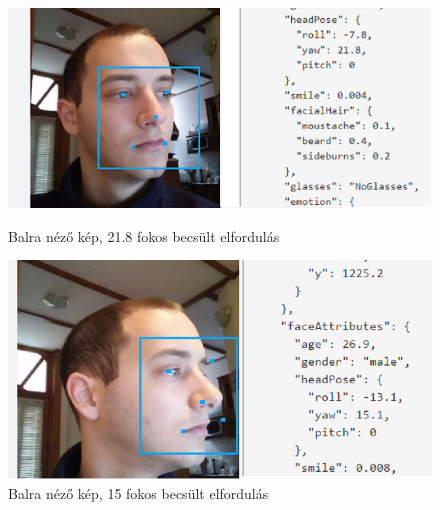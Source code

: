 \begin{figure}[h]
 \begin{minipage}{.5\textwidth} 
\centering
    \includegraphics[scale=0.3]{img/mpo_left}
    \caption{Balra néző kép, 21.8 fokos \newline becsült elfordulás}
 \end{minipage}
 \begin{minipage}{.5\textwidth} 
\centering
     \includegraphics[scale=0.3]{img/mpo_very_left}
     \caption{Balra néző kép, 15 fokos becsült elfordulás}
 \end{minipage}
\end{figure}

